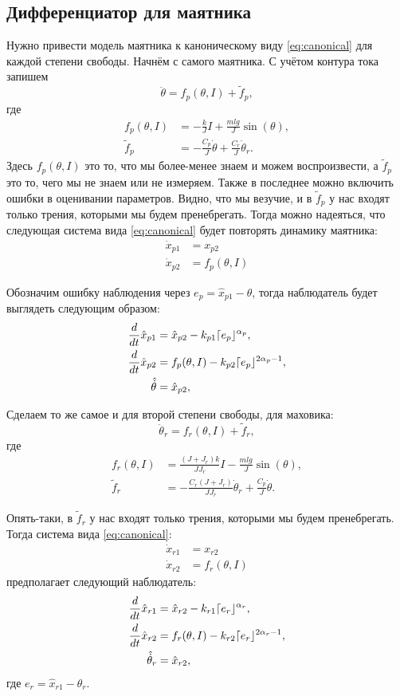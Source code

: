 \documentclass{article}
\DeclarePairedDelimiter{\homd}{\lceil}{\rfloor}
\begin{document}
\subsection{Дифференциатор для маятника}
Нужно привести модель маятника к каноническому виду \eqref{eq:canonical} для каждой степени свободы. Начнём с самого маятника. С учётом контура тока запишем
\[
	\ddot{\theta} = f_p(\theta,I) + \tilde{f}_p,
\]
где 
\[
	\begin{aligned}
		f_p(\theta,I) &= -\frac{k}{J}I + \frac{mlg}{J}\sin(\theta), \\ 
		\tilde{f}_p &= -\frac{C_p}{J}\dot{\theta} + \frac{C_r}{J}\dot{\theta}_r. 	
	\end{aligned}
\]
Здесь $f_p(\theta,I)$ это то, что мы более-менее знаем и можем воспроизвести, а $\tilde{f}_p$ это то, чего мы не знаем или не измеряем. 
Также в последнее можно включить ошибки в оценивании параметров. 
Видно, что мы везучие, и в $\tilde{f}_p$ у нас входят только трения, которыми мы будем пренебрегать.
Тогда можно надеяться, что следующая система вида \eqref{eq:canonical} будет повторять динамику маятника:
\begin{align*}
\dot{x}_{p1} &= x_{p2}\\
\dot{x}_{p2} &= f_p(\theta, I)
\end{align*}

Обозначим ошибку наблюдения через $e_p = \hat{x}_{p 1} - \theta$, тогда наблюдатель будет выглядеть следующим образом:
\[
	\begin{aligned}
		\frac{d}{dt}\hat{x}_{p 1} &= \hat{x}_{p 2} - k_{p 1}\homd{e_p}^{\alpha_p}, \\
		\frac{d}{dt}\hat{x}_{p 2} &= f_p(\theta,I) - k_{p 2}\homd{e_p}^{2\alpha_p-1}, \\
		\hat{\dot{\theta}} &= \hat{x}_{p2},
	\end{aligned}
\]

Сделаем то же самое и для второй степени свободы, для маховика:
\[
	\ddot{\theta}_r = f_r(\theta,I) + \tilde{f}_r,
\]
где 
\[
	\begin{aligned}
		f_r(\theta,I) &= \frac{(J+J_r)k}{JJ_r}I - \frac{mlg}{J}\sin(\theta), \\ 
		\tilde{f}_r &= -\frac{C_r(J+J_r)}{JJ_r}\dot{\theta}_r + \frac{C_p}{J}\dot{\theta}. 	
	\end{aligned}
\]

Опять-таки, в $\tilde{f}_r$ у нас входят только трения, которыми мы будем пренебрегать. Тогда система вида  \eqref{eq:canonical}:
\begin{align*}
\dot{x}_{r1} &= x_{r2}\\
\dot{x}_{r2} &= f_r(\theta, I)
\end{align*}
предполагает следующий наблюдатель:
\[
\begin{aligned}
	\frac{d}{dt}\hat{x}_{r 1} &= \hat{x}_{r 2} - k_{r 1}\homd{e_r}^{\alpha_r}, \\
	\frac{d}{dt}\hat{x}_{r 2} &= f_r(\theta,I) - k_{r 2}\homd{e_r}^{2\alpha_r-1}, \\
	\hat{\dot{\theta}}_r &= \hat{x}_{r2},
\end{aligned}
\]
где $e_r = \hat{x}_{r 1}  - \theta_r$.
\end{document}
